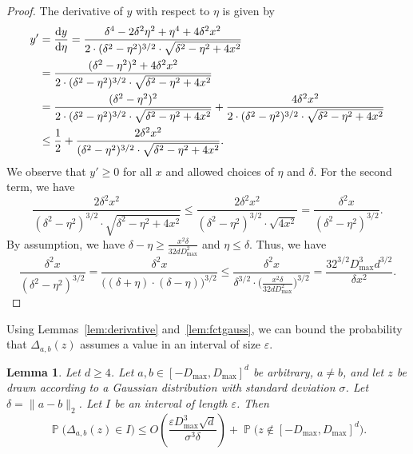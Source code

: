 \documentclass[11pt,DIV=12,a4paper]{scrartcl}
\newtheorem{lemma}[claim]{Lemma}
\newcommand{\eps}{\varepsilon}
\newcommand{\maxx}{D_{\max}}
\DeclareMathOperator{\probab}{\mathbb{P}}
\newcommand{\todo}[1]{\fbox{\bfseries\boldmath TODO: #1}}
\begin{document}
\begin{proof}
The derivative of $y$ with respect to $\eta$ is given by
\begin{align*}
y' & = \frac{\textup d y}{\textup d \eta} = \frac{\delta^4 - 2 \delta^2\eta^2 + \eta^4 + 4 \delta^2 x^2}{2 \cdot (\delta^2 - \eta^2)^{3/2} \cdot \sqrt{\delta^2 - \eta^2 + 4 x^2}}\\
& = \frac{(\delta^2 - \eta^2)^2 + 4 \delta^2 x^2}{2 \cdot (\delta^2 - \eta^2)^{3/2} \cdot \sqrt{\delta^2 - \eta^2 + 4 x^2}} \\
& = \frac{(\delta^2 - \eta^2)^2}{2 \cdot (\delta^2 - \eta^2)^{3/2} \cdot \sqrt{\delta^2 - \eta^2 + 4 x^2}}
+\frac{4 \delta^2 x^2}{2 \cdot (\delta^2 - \eta^2)^{3/2} \cdot \sqrt{\delta^2 - \eta^2 + 4 x^2}} \\
& \leq \frac 12 
+\frac{2 \delta^2 x^2}{(\delta^2 - \eta^2)^{3/2} \cdot \sqrt{\delta^2 - \eta^2 + 4 x^2}}.
\end{align*}
We observe that $y' \geq 0$ for all $x$ and allowed choices of $\eta$ and $\delta$.
For the second term, we have
\[
\frac{2 \delta^2 x^2}{(\delta^2 - \eta^2)^{3/2} \cdot \sqrt{\delta^2 - \eta^2 + 4 x^2}}
\leq 
\frac{2 \delta^2 x^2}{(\delta^2 - \eta^2)^{3/2} \cdot \sqrt{4 x^2}}
= \frac{\delta^2 x}{(\delta^2 - \eta^2)^{3/2}}.
\]
By assumption, we have $\delta - \eta \geq \frac{x^2\delta}{32d \maxx^2}$
and $\eta \leq \delta$.
Thus, we have
\[
\frac{\delta^2 x}{(\delta^2 - \eta^2)^{3/2}} 
 = \frac{\delta^2 x}{\bigl((\delta + \eta)\cdot (\delta - \eta) \bigr)^{3/2} } 
 \leq \frac{\delta^2 x}{\delta^{3/2} \cdot \bigl(\frac{x^2\delta}{32d \maxx^2}\bigr)^{3/2}} 
  = \frac{32^{3/2}\maxx^3d^{3/2}}{\delta x^2}  .
\]
\end{proof}


Using Lemmas~\ref{lem:derivative} and~\ref{lem:fctgauss}, we can bound the probability
that $\Delta_{a,b}(z)$ assumes a value in an interval of size $\eps$.


\begin{lemma}
\label{lem:differenceprob}
Let $d \geq 4$.
Let $a, b \in [-\maxx, \maxx]^d$ be arbitrary, $a \neq b$, and let
$z$ be drawn according to a Gaussian distribution with standard deviation $\sigma$.
Let $\delta = \|a-b\|_2$. Let $I$ be an interval of length $\eps$.
Then
\[
\probab\bigl(\Delta_{a,b}(z) \in I \bigr) \leq
  O\left(\frac{\eps \maxx^3 \sqrt d}{\sigma^3 \delta} \right) + \probab\bigl(z \notin [-\maxx, \maxx]^d\bigr).
\]
\end{lemma}
\end{document}
